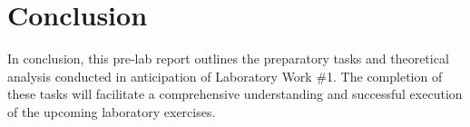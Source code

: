 \chapter{Conclusion}

In conclusion, this pre-lab report outlines the preparatory tasks and theoretical analysis conducted in anticipation of Laboratory Work \#1. The completion of these tasks will facilitate a comprehensive understanding and successful execution of the upcoming laboratory exercises.
